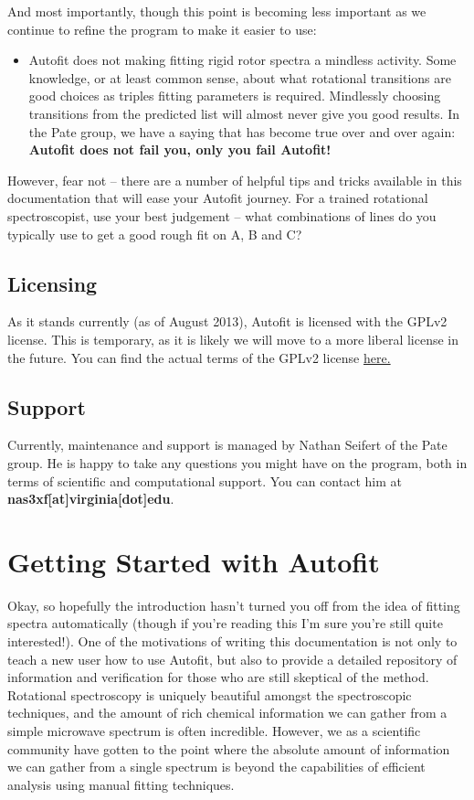 \documentclass[letterpaper,10pt,english]{sphinxmanual}
\begin{document}
And most importantly, though this point is becoming less important as we continue to refine the program to make it easier to use:
\begin{itemize}
\item {} 
Autofit does not making fitting rigid rotor spectra a mindless activity. Some knowledge, or at least common sense, about what rotational transitions are good choices as triples fitting parameters is required. Mindlessly choosing transitions from the predicted list will almost never give you good results. In the Pate group, we have a saying that has become true over and over again: \textbf{Autofit does not fail you, only you fail Autofit!}

\end{itemize}

However, fear not -- there are a number of helpful tips and tricks available in this documentation that will ease your Autofit journey. For a trained rotational spectroscopist, use your best judgement -- what combinations of lines do you typically use to get a good rough fit on A, B and C?


\section{Licensing}
\label{intro:licensing}
As it stands currently (as of August 2013), Autofit is licensed with the GPLv2 license. This is temporary, as it is likely we will move to a more liberal license
in the future. You can find the actual terms of the GPLv2 license \href{http://www.gnu.org/licenses/gpl-2.0.html}{here.}


\section{Support}
\label{intro:support}
Currently, maintenance and support is managed by Nathan Seifert of the Pate group. He is happy to take any questions you might have on the program, both in terms
of scientific and computational support. You can contact him at \textbf{nas3xf{[}at{]}virginia{[}dot{]}edu}.


\chapter{Getting Started with Autofit}
\label{gettingstarted:getting-started-with-autofit}\label{gettingstarted::doc}
Okay, so hopefully the introduction hasn't turned you off from the idea of fitting spectra automatically (though if you're reading this I'm sure you're still quite interested!). One of the motivations of writing this documentation
is not only to teach a new user how to use Autofit, but also to provide a detailed repository of information and verification for those who are still skeptical of the method. Rotational spectroscopy is uniquely beautiful amongst
the spectroscopic techniques, and the amount of rich chemical information we can gather from a simple microwave spectrum is often incredible. However, we as a scientific community have gotten to the point where the absolute amount of information we can gather from a single spectrum is beyond the capabilities of efficient analysis using manual fitting techniques.
\end{document}
